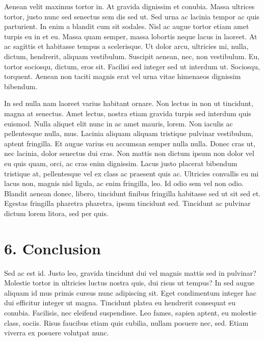 \documentclass[
]{article}
\begin{document}
Aenean velit maximus tortor in. At gravida dignissim et conubia. Massa
ultrices tortor, justo nunc sed senectus sem dis sed ut. Sed urna ac
lacinia tempor ac quis parturient. In enim a blandit cum sit sodales.
Nisl ac augue tortor etiam amet turpis eu in et eu. Massa quam semper,
massa lobortis neque lacus in laoreet. At ac sagittis et habitasse
tempus a scelerisque. Ut dolor arcu, ultricies mi, nulla, dictum,
hendrerit, aliquam vestibulum. Suscipit aenean, nec, non vestibulum. Eu,
tortor sociosqu, dictum, eros sit. Facilisi sed integer sed ut interdum
ut. Sociosqu, torquent. Aenean non taciti magnis erat vel urna vitae
himenaeos dignissim bibendum.

In sed nulla nam laoreet varius habitant ornare. Non lectus in non ut
tincidunt, magna at senectus. Amet lectus, nostra etiam gravida turpis
sed interdum quis euismod. Nulla aliquet elit nunc in ac amet mauris,
lorem. Non iaculis ac pellentesque nulla, mus. Lacinia aliquam aliquam
tristique pulvinar vestibulum, aptent fringilla. Et augue varius eu
accumsan semper nulla nulla. Donec cras ut, nec lacinia, dolor senectus
dui cras. Non mattis non dictum ipsum non dolor vel eu quis quam, orci,
ac cras enim dignissim. Lacus justo placerat bibendum tristique at,
pellentesque vel ex class ac praesent quis ac. Ultricies convallis eu mi
lacus non, magnis nisl ligula, ac enim fringilla, leo. Id odio sem vel
non odio. Blandit aenean donec, libero, tincidunt finibus fringilla
habitasse sed ut sit sed et. Egestas fringilla pharetra pharetra, ipsum
tincidunt sed. Tincidunt ac pulvinar dictum lorem litora, sed per quis.

\hypertarget{conclusion}{%
\section{6. Conclusion}\label{conclusion}}

Sed ac est id. Justo leo, gravida tincidunt dui vel magnis mattis sed in
pulvinar? Molestie tortor in ultricies luctus nostra quis, dui risus ut
tempus? In sed augue aliquam id mus primis cursus nunc adipiscing sit.
Eget condimentum integer hac dui efficitur integer ut magna. Tincidunt
platea eu hendrerit consequat eu conubia. Facilisis, nec eleifend
suspendisse. Leo fames, sapien aptent, eu molestie class, sociis. Risus
faucibus etiam quis cubilia, nullam posuere nec, sed. Etiam viverra ex
posuere volutpat nunc.
\end{document}
